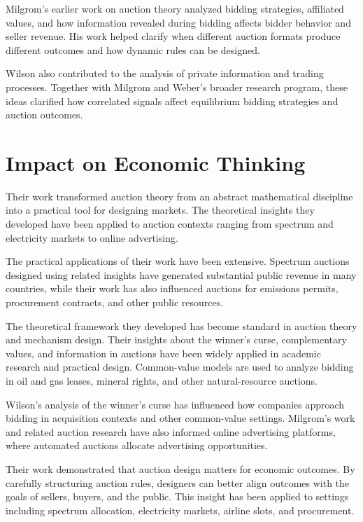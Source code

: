 Milgrom's earlier work on auction theory analyzed bidding strategies, affiliated
values, and how information revealed during bidding affects bidder behavior and
seller revenue. His work helped clarify when different auction formats produce
different outcomes and how dynamic rules can be designed.

Wilson also contributed to the analysis of private information and trading
processes. Together with Milgrom and Weber's broader research program, these
ideas clarified how correlated signals affect equilibrium bidding strategies and
auction outcomes.

\section{Impact on Economic Thinking}
Their work transformed auction theory from an abstract mathematical discipline
into a practical tool for designing markets. The theoretical insights they
developed have been applied to auction contexts ranging from spectrum and
electricity markets to online advertising.

The practical applications of their work have been extensive. Spectrum auctions
designed using related insights have generated substantial public revenue in many
countries, while their work has also influenced auctions for emissions permits,
procurement contracts, and other public resources.

The theoretical framework they developed has become standard in auction theory and
mechanism design. Their insights about the winner's curse, complementary values,
and information in auctions have been widely applied in academic research and
practical design. Common-value models are used to analyze bidding in oil and gas
leases, mineral rights, and other natural-resource auctions.

Wilson's analysis of the winner's curse has influenced how companies approach
bidding in acquisition contexts and other common-value settings. Milgrom's work
and related auction research have also informed online advertising platforms,
where automated auctions allocate advertising opportunities.

Their work demonstrated that auction design matters for economic outcomes. By
carefully structuring auction rules, designers can better align outcomes with the
goals of sellers, buyers, and the public. This insight has been applied to settings
including spectrum allocation, electricity markets, airline slots, and procurement.

